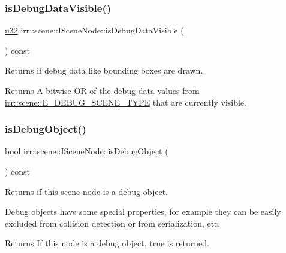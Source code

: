 \subsubsection{\texorpdfstring{is\+Debug\+Data\+Visible()}{isDebugDataVisible()}}
{\footnotesize\ttfamily \hyperlink{namespaceirr_a0416a53257075833e7002efd0a18e804}{u32} irr\+::scene\+::\+I\+Scene\+Node\+::is\+Debug\+Data\+Visible (\begin{DoxyParamCaption}{ }\end{DoxyParamCaption}) const\hspace{0.3cm}{\ttfamily [inline]}}



Returns if debug data like bounding boxes are drawn. 

\begin{DoxyReturn}{Returns}
A bitwise OR of the debug data values from \hyperlink{namespaceirr_1_1scene_a52b664c4c988113735042b168fc32dbe}{irr\+::scene\+::\+E\+\_\+\+D\+E\+B\+U\+G\+\_\+\+S\+C\+E\+N\+E\+\_\+\+T\+Y\+PE} that are currently visible. 
\end{DoxyReturn}
\mbox{\label{classirr_1_1scene_1_1ISceneNode_a304529a50ee58361a84d1db012bbc476}} 
\subsubsection{\texorpdfstring{is\+Debug\+Object()}{isDebugObject()}}
{\footnotesize\ttfamily bool irr\+::scene\+::\+I\+Scene\+Node\+::is\+Debug\+Object (\begin{DoxyParamCaption}{ }\end{DoxyParamCaption}) const\hspace{0.3cm}{\ttfamily [inline]}}



Returns if this scene node is a debug object. 

Debug objects have some special properties, for example they can be easily excluded from collision detection or from serialization, etc. \begin{DoxyReturn}{Returns}
If this node is a debug object, true is returned. 
\end{DoxyReturn}
\mbox{\label{classirr_1_1scene_1_1ISceneNode_a457fda8e5bca28a1c7af1691fefd4f75}} 

